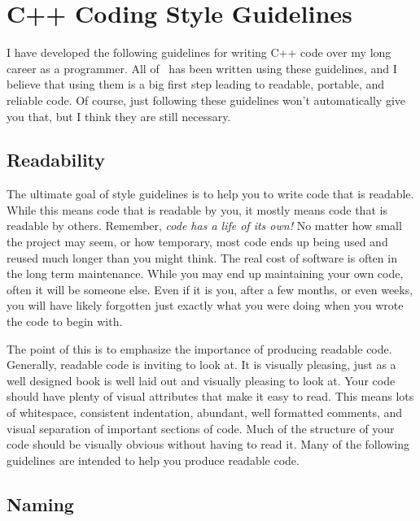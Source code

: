 
\chapter{C++ Coding Style Guidelines}

I have developed the following guidelines for writing C++ code
over my long career as a programmer. All of \V\ has been written
using these guidelines, and I believe that using them is a big
first step leading to readable, portable, and reliable code.
Of course, just following these guidelines won't automatically
give you that, but I think they are still necessary.


\section {Readability}

The ultimate goal of style guidelines is to help you to write code
that is readable. While this means code that is readable by you,
it mostly means code that is readable by others. Remember,
\emph{code has a life of its own!} No matter how small the project
may seem, or how temporary, most code ends up being used and reused
much longer than you might think. The real cost of software
is often in the long term maintenance. While you may end up maintaining
your own code, often it will be someone else. Even if it is you,
after a few months, or even weeks, you will have likely forgotten
just exactly what you were doing when you wrote the code to begin
with.

The point of this is to emphasize the importance of producing readable
code. Generally, readable code is inviting to look at. It is visually
pleasing, just as a well designed book is well laid out and visually
pleasing to look at.  Your code should have plenty of visual attributes
that make it easy to read.  This means lots of whitespace, consistent
indentation, abundant, well formatted comments, and visual
separation of important sections of code. Much of the structure
of your code should be visually obvious without having to read it.
Many of the following guidelines are intended to help
you produce readable code.

\section{Naming}

